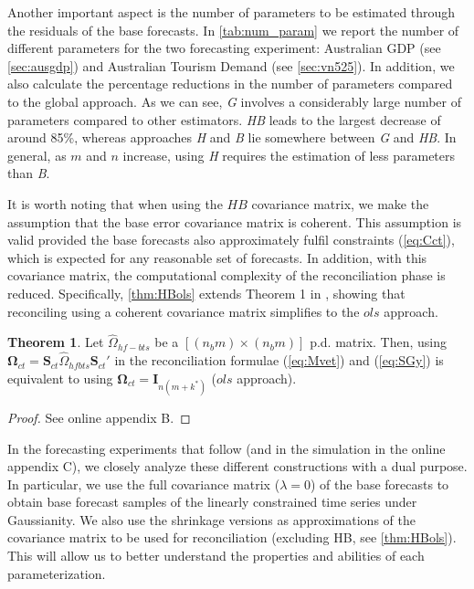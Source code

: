 \documentclass[a4paper,11pt]{article}
\newcommand{\Ivet}{\bm{I}}
\newcommand{\Svet}{\bm{S}}
\newcommand{\Omegavet}{\bm{\Omega}}
\theoremstyle{definition}
\newtheorem{theorem}{Theorem}[section]
\begin{document}
Another important aspect is the number of parameters to be estimated through the residuals of the base forecasts. In \autoref{tab:num_param} we report the number of different parameters %
for the two forecasting experiment: Australian GDP (see \autoref{sec:ausgdp}) and Australian Tourism Demand (see \autoref{sec:vn525}). In addition, we also calculate the percentage reductions in the number of parameters compared to the global approach. %
As we can see, \textit{G} involves a considerably large number of parameters compared to other estimators. \textit{HB} leads to the largest decrease of around 85\%, whereas approaches \textit{H} and \textit{B}  lie somewhere between \textit{G} and \textit{HB}. In general, as $m$ and $n$ increase, using \textit{H} requires the estimation of less parameters than \textit{B}.

It is worth noting that when using the $HB$ covariance matrix, we make the assumption that the base error covariance matrix is coherent. This assumption is valid provided the base forecasts also approximately fulfil constraints (\ref{eq:Cct}), which is expected for any reasonable set of forecasts. %
In addition, with this covariance matrix, the computational complexity of the reconciliation phase is reduced. Specifically, \autoref{thm:HBols} extends %
Theorem 1 in \cite{hyndman2011}, showing that reconciling using a coherent covariance matrix simplifies to the $ols$ approach.
\begin{theorem}\label{thm:HBols}
	Let $\widehat{\Omega}_{hf-bts}$ be a $[(n_bm)\times (n_bm)]$ p.d. matrix. Then, using $\Omegavet_{ct} = \Svet_{ct}\widehat{\Omega}_{hfbts}\Svet_{ct}'$ in the reconciliation formulae (\ref{eq:Mvet}) and (\ref{eq:SGy}) is equivalent to using $\Omegavet_{ct} = \Ivet_{n(m+k^\ast)}$ ($ols$ approach).
\end{theorem}
\begin{proof}
	See online appendix B.
\end{proof}

In the forecasting experiments that follow (and in the simulation in the online appendix C), we closely analyze these different constructions with a dual purpose. In particular, we use the full covariance matrix ($\lambda = 0$) of the base forecasts to obtain base forecast samples of the linearly constrained time series under Gaussianity. We also use the shrinkage versions as approximations of the covariance matrix to be used for reconciliation (excluding HB, see \autoref{thm:HBols}). This will allow us to better understand the properties and abilities of each parameterization.
\end{document}
